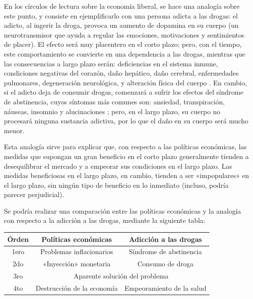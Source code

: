 \documentclass[12pt,a4paper,twoside]{book}
\begin{document}
En los círculos de lectura sobre la economía liberal, se hace una analogía sobre este punto, y consiste en ejemplificarlo con una persona adicta a las drogas: el adicto, al ingerir la droga, provoca un aumento de dopamina en su cuerpo (un neurotransmisor que ayuda a regular las emociones, motivaciones y sentimientos de placer). El efecto será muy placentero en el corto plazo; pero, con el tiempo, este comportamiento se convierte en una dependencia a las drogas, mientras que las consecuencias a largo plazo serán: deficiencias en el sistema inmune, condiciones negativas del corazón, daño hepático, daño cerebral, enfermedades pulmonares, degeneración neurológica, y alteración física del cuerpo \cite{problemas-droga}. En cambio, si el adicto deja de consumir drogas, comenzará a sufrir los efectos del síndrome de abstinencia, cuyos síntomas más comunes son: ansiedad, transpiración, náuseas, insomnio y alucinaciones \cite{abstinencia}; pero, en el largo plazo, su cuerpo no procesará ninguna sustancia adictiva, por lo que el daño en su cuerpo será mucho menor.

Esta analogía sirve para explicar que, con respecto a las políticas económicas, las medidas que supongan un gran beneficio en el corto plazo generalmente tienden a desequilibrar el mercado y a empeorar sus condiciones en el largo plazo. Las medidas beneficiosas en el largo plazo, en cambio, tienden a ser «impopulares» en el largo plazo, sin ningún tipo de beneficio en lo inmediato (incluso, podría parecer perjudicial). 

Se podría realizar una comparación entre las políticas económicas y la analogía con respecto a la adicción a las drogas, mediante la siguiente tabla:

\begin{center}
\begin{tabular}{|c|c|c|}
\hline 
\textbf{Órden} & \textbf{Políticas económicas} & \textbf{Adicción a las drogas} \\ 
\hline 
1ero & Problemas inflacionarios & Síndrome de abstinencia \\ 
\hline 
2do & «Inyección» monetaria & Consumo de droga \\ 
\hline 
3ro & \multicolumn{2}{|c|}{Aparente solución del problema} \\ 
\hline 
4to & Destrucción de la economía & Empeoramiento de la salud \\ 
\hline 
\end{tabular} 
\end{center}
\end{document}
